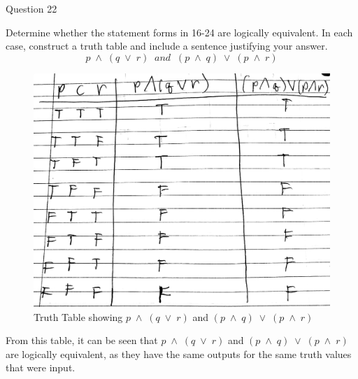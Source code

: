 \documentclass{article}
\begin{document}
\clearpage
{} Question 22
\item[]Determine whether the statement forms in 16-24 are logically equivalent. In each case, construct a truth table and include a sentence justifying your answer.
$$p \; \land \; (q \; \lor \; r) \;\; and \;\; (p\;\land \; q) \; \lor \; (p \; \land \; r)$$ 
\begin{figure}[h!]
  \includegraphics[width=\linewidth]{tt2.jpg}
  \caption{Truth Table showing $p \; \land \; (q \; \lor \; r)$ and $(p\;\land \; q) \; \lor \; (p \; \land \; r)$}
  \label{fig:table2}
\end{figure}
\item[] From this table, it can be seen that $p \; \land \; (q \; \lor \; r) $ and  $(p\;\land \; q) \; \lor \; (p \; \land \; r)$ are logically equivalent, as they have the same outputs for the same truth values that were input.
\end{document}
